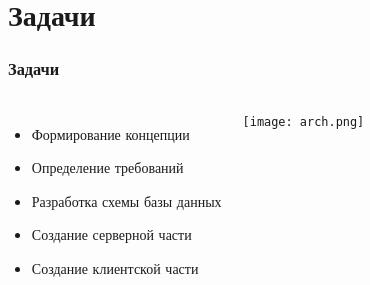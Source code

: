 \documentclass[12pt]{beamer}
\begin{document}
    \section{Задачи}
    \begin{frame}
        \frametitle{Задачи}

        \begin{columns}

            \begin{itemize}
                \item Формирование концепции
                \item Определение требований
                \item Разработка схемы базы данных
                \item Создание серверной части
                \item Создание клиентской части
            \end{itemize}

            \texttt{[image: arch.png]}
            
        \end{columns}
        
    \end{frame}
\end{document}
